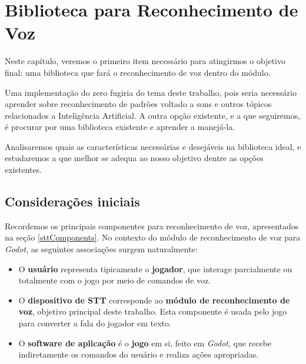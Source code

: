 \chapter{Biblioteca para Reconhecimento de Voz}
\label{cap:speech-libs}

Neste capítulo, veremos o primeiro item necessário para atingirmos o objetivo final: uma biblioteca que fará o reconhecimento de voz dentro do módulo.

Uma implementação do zero fugiria do tema deste trabalho, pois seria necessário aprender sobre reconhecimento de padrões voltado a sons e outros tópicos relacionados a Inteligência Artificial. A outra opção existente, e a que seguiremos, é procurar por uma biblioteca existente e aprender a manejá-la.

Analisaremos quais as características necessárias e desejáveis na biblioteca ideal, e estudaremos a que melhor se adequa ao nosso objetivo dentre as opções existentes.


\section{Considerações iniciais}

Recordemos os principais componentes para reconhecimento de voz, apresentados na seção \ref{sttComponents}. No contexto do módulo de reconhecimento de voz para \textit{Godot}, as seguintes associações surgem naturalmente:

\begin{itemize}
\item O \textbf{usuário} representa tipicamente o \textbf{jogador}, que interage parcialmente ou totalmente com o jogo por meio de comandos de voz.

\item O \textbf{dispositivo de STT} corresponde ao \textbf{módulo de reconhecimento de voz}, objetivo principal deste trabalho. Esta componente é usada pelo jogo para converter a fala do jogador em texto.

\item O \textbf{software de aplicação} é o \textbf{jogo} em si, feito em \textit{Godot}, que recebe indiretamente os comandos do usuário e realiza ações apropriadas.
\end{itemize}


